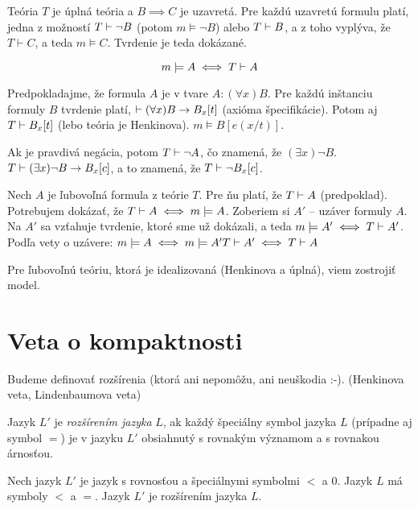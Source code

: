 Teória $T$ je úplná teória a $B \implies C$ je uzavretá. Pre každú uzavretú
formulu platí, jedna z možností $T \vdash \neg B$ (potom $m \models \neg B$)
alebo $T \vdash B$, a z toho vyplýva, že $T \vdash C$, a teda $m \models C$.
Tvrdenie je teda dokázané.

\begin{equation}
    m \models A \iff T \vdash A
\end{equation}

\par Predpokladajme, že formula $A$ je v tvare $A: (\forall x) B$. Pre každú
inštanciu formuly $B$ tvrdenie platí, $\vdash (\forall x) B \rightarrow B_x[t]$
(axióma špecifikácie). Potom aj $T \vdash B_x[t]$ (lebo teória je Henkinova). $m \models B[e(x/t)]$.

\par Ak je pravdivá negácia, potom $T \vdash \neg A$, čo znamená, že $(\exists
x) \neg B$. $T \vdash (\exists x) \neg B \rightarrow B_x[c]$, a to znamená, že $T
\vdash \neg B_x[c]$.

\par Nech $A$ je ľubovoľná formula z teórie $T$. Pre ňu platí, že $T \vdash A$
(predpoklad). Potrebujem dokázať, že $T \vdash A \iff m \models A$. Zoberiem si
$A'$ -- uzáver formuly $A$. Na $A'$ sa vzťahuje tvrdenie, ktoré sme už dokázali,
a teda $m \models A' \iff T \vdash A'$. Podľa vety o uzávere:
$m \models A \iff  m\models A' T \vdash A' \iff T \vdash A$

\par Pre ľubovoľnú teóriu, ktorá je idealizovaná (Henkinova a úplná), viem
zostrojiť model.

\section{Veta o kompaktnosti}

Budeme definovať rozšírenia (ktorá ani nepomôžu, ani neuškodia :-). (Henkinova
veta, Lindenbaumova veta)

\begin{definicia}
    Jazyk $L'$ je \emph{rozšírením jazyka} $L$, ak každý
    špeciálny symbol jazyka $L$ (prípadne aj symbol $=$)
    je v jazyku $L'$ obsiahnutý s rovnakým významom a s rovnakou árnosťou.
\end{definicia}

\begin{priklad}
    Nech jazyk $L'$ je jazyk s rovnosťou a špeciálnymi symbolmi $<$ a $0$.
    Jazyk $L$ má symboly $<$ a $=$. Jazyk $L'$ je rozšírením jazyka $L$.
\end{priklad}    

